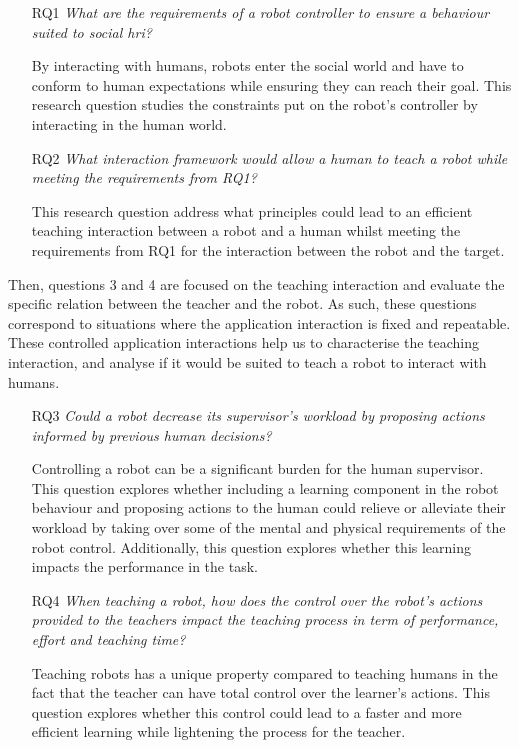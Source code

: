 \begin{itemize}
	\item [RQ1] \emph{What are the requirements of a robot controller to ensure a behaviour suited to social \gls{hri}?} 
	
		By interacting with humans, robots enter the social world and have to conform to human expectations while ensuring they can reach their goal. This research question studies the constraints put on the robot's controller by interacting in the human world. 
		
    \item [RQ2] \emph{What interaction framework would allow a human to teach a robot while meeting the requirements from RQ1?}
    
    	This research question address what principles could lead to an efficient teaching interaction between a robot and a human whilst meeting the requirements from RQ1 for the interaction between the robot and the target. 
\end{itemize}    	

Then, questions 3 and 4 are focused on the teaching interaction and evaluate the specific relation between the teacher and the robot. As such, these questions correspond to situations where the application interaction is fixed and repeatable. These controlled application interactions help us to characterise the teaching interaction, and analyse if it would be suited to teach a robot to interact with humans.
\begin{itemize}
    \item [RQ3] \emph{Could a robot decrease its supervisor's workload by proposing actions informed by previous human decisions?}
    
        Controlling a robot can be a significant burden for the human supervisor. This question explores whether including a learning component in the robot behaviour and proposing actions to the human could relieve or alleviate their workload by taking over some of the mental and physical requirements of the robot control. Additionally, this question explores whether this learning impacts the performance in the task.
    
    \item [RQ4] \emph{When teaching a robot, how does the control over the robot's actions provided to the teachers impact the teaching process in term of performance, effort and teaching time?} 
    
    	Teaching robots has a unique property compared to teaching humans in the fact that the teacher can have total control over the learner's actions. This question explores whether this control could lead to a faster and more efficient learning while lightening the process for the teacher.
\end{itemize}    	

